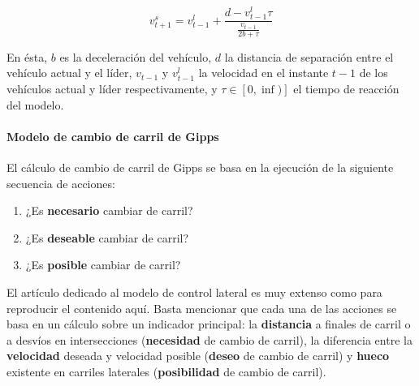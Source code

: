 \begin{equation}
	v_{t+1}^{s} = v_{t-1}^l + \frac{d - v_{t-1}^l \tau}{\frac{v_{t-1}}{2b + \tau}}
	\label{eq:krauss-model-safe-speed}
\end{equation}

En ésta, $b$ es la deceleración del vehículo, $d$ la distancia de separación entre el vehículo actual y el líder, $v_{t-1}$ y $v_{t-1}^l$ la velocidad en el instante ${t-1}$ de los vehículos actual y líder respectivamente, y $\tau \in [0, \inf)]$ el tiempo de reacción del modelo.

\paragraph{Modelo de cambio de carril de Gipps}

El cálculo de cambio de carril de Gipps \cite{Gipps1986} se basa en la ejecución de la siguiente secuencia de acciones:

\begin{enumerate}
	\item ¿Es \textbf{necesario} cambiar de carril?
	\item ¿Es \textbf{deseable} cambiar de carril?
	\item ¿Es \textbf{posible} cambiar de carril?
\end{enumerate}

El artículo dedicado al modelo de control lateral es muy extenso como para reproducir el contenido aquí. Basta mencionar que cada una de las acciones se basa en un cálculo sobre un indicador principal: la \textbf{distancia} a finales de carril o a desvíos en intersecciones (\textbf{necesidad} de cambio de carril), la diferencia entre la \textbf{velocidad} deseada y velocidad posible (\textbf{deseo} de cambio de carril) y \textbf{hueco} existente en carriles laterales (\textbf{posibilidad} de cambio de carril).

